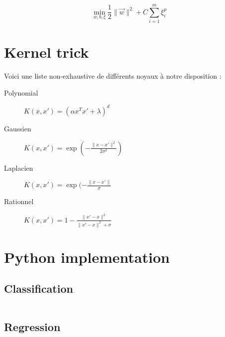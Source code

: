 \begin{equation}
	\min_{w,b,\xi} \frac{1}{2} \lVert \vec w \rVert ^2 + C\sum_{i=1}^m \xi_i^p
\end{equation}


\section{Kernel trick}

Voici une liste non-exhaustive de diff\'erents noyaux \`a notre disposition :
\begin{description}
	\item[Polynomial] $K(x, x\prime) = (\alpha x^T x\prime + \lambda )^d$
	\item[Gaussien] $K(x, x\prime) = \exp(-\frac{\lVert x - x\prime \rVert^2}{2\sigma^2})$
	\item[Laplacien] $K(x, x\prime) = \exp(-\frac{\lVert x - x\prime\rVert}{\sigma}$
	\item[Rationnel] $K(x, x\prime) = 1 - \frac{\lVert x\prime - x \rVert^2}{\lVert x\prime - x \rVert^2 + \sigma}$
\end{description}


\section{Python implementation}

\subsection{Classification}

\inputminted{python}{code/machine-learning/svc.py}

\subsection{Regression}

\inputminted{python}{code/machine-learning/svr.py}

